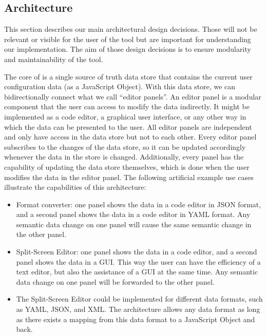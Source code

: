 
\subsection{Architecture}\label{subsec:architecture} %
This section describes our main architectural design decisions.
Those will not be relevant or visible for the user of the tool but are important for understanding our implementation.
The aim of those design decisions is to ensure modularity and maintainability of the tool.

The core of \toolname{} is a single source of truth data store that contains the current user configuration data (as a JavaScript Object).
With this data store, we can bidirectionally connect what we call ``editor panels''.
An editor panel is a modular component that the user can access to modify the data indirectly.
It might be implemented as a code editor, a graphical user interface, or any other way in which the data can be presented to the user.
All editor panels are independent and only have access in the data store but not to each other.
Every editor panel subscribes to the changes of the data store, so it can be updated accordingly whenever the data in the store is changed.
Additionally, every panel has the capability of updating the data store themselves, which is done when the user modifies the data in the editor panel.
The following artificial example use cases illustrate the capabilities of this architecture:

\begin{itemize}
    \item Format converter: one panel shows the data in a code editor in JSON format, and a second panel shows the data in a code editor in YAML format. Any semantic data change on one panel will cause the same semantic change in the other panel.
    \item Split-Screen Editor: one panel shows the data in a code editor, and a second panel shows the data in a GUI. This way the user can have the efficiency of a text editor, but also the assistance of a GUI at the same time. Any semantic data change on one panel will be forwarded to the other panel.
    \item The Split-Screen Editor could be implemented for different data formats, such as YAML, JSON, and XML. The architecture allows any data format as long as there exists a mapping from this data format to a JavaScript Object and back.
\end{itemize}

